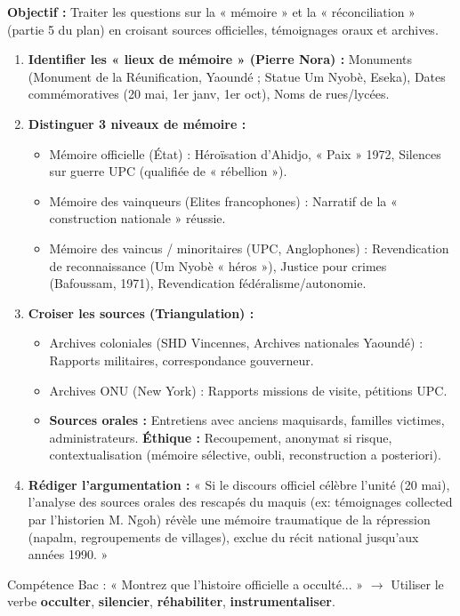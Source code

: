 \documentclass[11pt]{article}
\newcommand{\cle}[1]{{\popxbold\color{popdark}#1}}
\begin{document}
\begin{methode}
\textbf{Objectif :} Traiter les questions sur la « mémoire » et la « réconciliation » (partie 5 du plan) en croisant sources officielles, témoignages oraux et archives.
\begin{enumerate}
    \item \textbf{Identifier les « lieux de mémoire » (Pierre Nora) :} Monuments (Monument de la Réunification, Yaoundé ; Statue Um Nyobè, Eseka), Dates commémoratives (20 mai, 1er janv, 1er oct), Noms de rues/lycées.
    \item \textbf{Distinguer 3 niveaux de mémoire :}
        \begin{itemize}
            \item \cle{Mémoire officielle (État) :} Héroïsation d'Ahidjo, « Paix » 1972, Silences sur guerre UPC (qualifiée de « rébellion »).
            \item \cle{Mémoire des vainqueurs (Elites francophones) :} Narratif de la « construction nationale » réussie.
            \item \cle{Mémoire des vaincus / minoritaires (UPC, Anglophones) :} Revendication de reconnaissance (Um Nyobè « héros »), Justice pour crimes (Bafoussam, 1971), Revendication fédéralisme/autonomie.
        \end{itemize}
    \item \textbf{Croiser les sources (Triangulation) :}
        \begin{itemize}
            \item Archives coloniales (SHD Vincennes, Archives nationales Yaoundé) : Rapports militaires, correspondance gouverneur.
            \item Archives ONU (New York) : Rapports missions de visite, pétitions UPC.
            \item \textbf{Sources orales :} Entretiens avec anciens maquisards, familles victimes, administrateurs. \textbf{Éthique :} Recoupement, anonymat si risque, contextualisation (mémoire sélective, oubli, reconstruction a posteriori).
        \end{itemize}
    \item \textbf{Rédiger l'argumentation :} « Si le discours officiel célèbre l'unité (20 mai), l'analyse des sources orales des rescapés du maquis (ex: témoignages collected par l'historien M. Ngoh) révèle une mémoire traumatique de la répression (napalm, regroupements de villages), exclue du récit national jusqu'aux années 1990. »
\end{enumerate}
\cle{Compétence Bac :} « Montrez que l'histoire officielle a occulté... » $\rightarrow$ Utiliser le verbe \textbf{occulter}, \textbf{silencier}, \textbf{réhabiliter}, \textbf{instrumentaliser}.
\end{methode}
\end{document}
